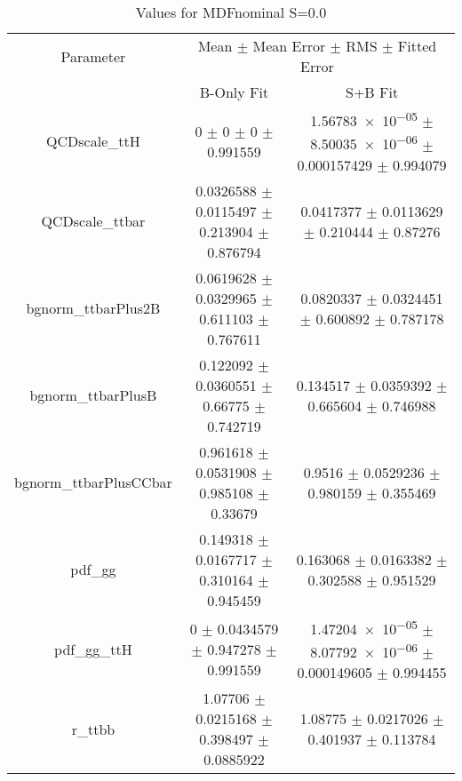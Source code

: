 \begin{table}
\centering
\caption{Values for MDFnominal S=0.0}
\begin{tabular}{ccc}
\toprule
Parameter & \multicolumn{2}{c}{Mean $\pm$ Mean Error $\pm$ RMS $\pm$ Fitted Error}\\
 & B-Only Fit & S+B Fit\\
\midrule
QCDscale\_ttH & \num{0} $\pm$ \num{0} $\pm$ \num{0} $\pm$ \num{0.991559} & \num{1.56783e-05} $\pm$ \num{8.50035e-06} $\pm$ \num{0.000157429} $\pm$ \num{0.994079}\\
QCDscale\_ttbar & \num{0.0326588} $\pm$ \num{0.0115497} $\pm$ \num{0.213904} $\pm$ \num{0.876794} & \num{0.0417377} $\pm$ \num{0.0113629} $\pm$ \num{0.210444} $\pm$ \num{0.87276}\\
bgnorm\_ttbarPlus2B & \num{0.0619628} $\pm$ \num{0.0329965} $\pm$ \num{0.611103} $\pm$ \num{0.767611} & \num{0.0820337} $\pm$ \num{0.0324451} $\pm$ \num{0.600892} $\pm$ \num{0.787178}\\
bgnorm\_ttbarPlusB & \num{0.122092} $\pm$ \num{0.0360551} $\pm$ \num{0.66775} $\pm$ \num{0.742719} & \num{0.134517} $\pm$ \num{0.0359392} $\pm$ \num{0.665604} $\pm$ \num{0.746988}\\
bgnorm\_ttbarPlusCCbar & \num{0.961618} $\pm$ \num{0.0531908} $\pm$ \num{0.985108} $\pm$ \num{0.33679} & \num{0.9516} $\pm$ \num{0.0529236} $\pm$ \num{0.980159} $\pm$ \num{0.355469}\\
pdf\_gg & \num{0.149318} $\pm$ \num{0.0167717} $\pm$ \num{0.310164} $\pm$ \num{0.945459} & \num{0.163068} $\pm$ \num{0.0163382} $\pm$ \num{0.302588} $\pm$ \num{0.951529}\\
pdf\_gg\_ttH & \num{0} $\pm$ \num{0.0434579} $\pm$ \num{0.947278} $\pm$ \num{0.991559} & \num{1.47204e-05} $\pm$ \num{8.07792e-06} $\pm$ \num{0.000149605} $\pm$ \num{0.994455}\\
r\_ttbb & \num{1.07706} $\pm$ \num{0.0215168} $\pm$ \num{0.398497} $\pm$ \num{0.0885922} & \num{1.08775} $\pm$ \num{0.0217026} $\pm$ \num{0.401937} $\pm$ \num{0.113784}\\
\bottomrule
\end{tabular}
\end{table}